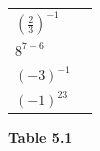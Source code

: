 {{\begin{center}
\begin{tabular}[t]{|l|l|}
                  ${\left(\frac{2}{3}\right)}^{-1}$
                 &
     \tabularnewline\cline{1-1}\cline{2-2}
                  ${8}^{7-6}$
                 &
     \tabularnewline\cline{1-1}\cline{2-2}
                  ${\left(-3\right)}^{-1}$
                 &
     \tabularnewline\cline{1-1}\cline{2-2}
                  ${\left(-1\right)}^{23}$
                 &
     \tabularnewline\cline{1-1}\cline{2-2}
    \end{tabular}
      \end{center}
    \begin{center}{\small\bfseries Table 5.1}\end{center}
          }{ %
}}

